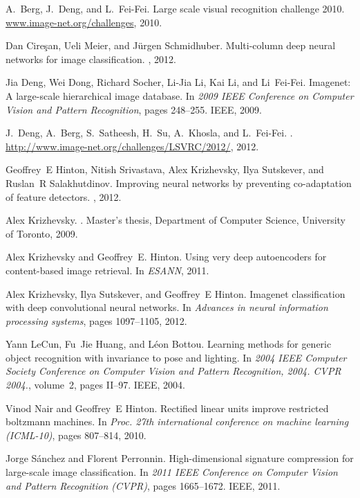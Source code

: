 \documentclass{article}
\begin{document}
\begin{thebibliography}{1}

A.~Berg, J.~Deng, and L.~Fei-Fei.
\newblock Large scale visual recognition challenge 2010.
\newblock \url{www.image-net.org/challenges}, 2010.

Dan Cire{\c{s}}an, Ueli Meier, and J{\"u}rgen Schmidhuber.
\newblock Multi-column deep neural networks for image classification.
, 2012.

Jia Deng, Wei Dong, Richard Socher, Li-Jia Li, Kai Li, and Li~Fei-Fei.
\newblock Imagenet: A large-scale hierarchical image database.
\newblock In {\em 2009 IEEE Conference on Computer Vision and Pattern
  Recognition}, pages 248--255. IEEE, 2009.

J.~Deng, A.~Berg, S.~Satheesh, H.~Su, A.~Khosla, and L.~Fei-Fei.
.
\newblock \url{http://www.image-net.org/challenges/LSVRC/2012/}, 2012.

Geoffrey~E Hinton, Nitish Srivastava, Alex Krizhevsky, Ilya Sutskever, and
  Ruslan~R Salakhutdinov.
\newblock Improving neural networks by preventing co-adaptation of feature
  detectors.
, 2012.

Alex Krizhevsky.
.
\newblock Master's thesis, Department of Computer Science, University of
  Toronto, 2009.

Alex Krizhevsky and Geoffrey~E. Hinton.
\newblock Using very deep autoencoders for content-based image retrieval.
\newblock In {\em ESANN}, 2011.

Alex Krizhevsky, Ilya Sutskever, and Geoffrey~E Hinton.
\newblock Imagenet classification with deep convolutional neural networks.
\newblock In {\em Advances in neural information processing systems}, pages
  1097--1105, 2012.

Yann LeCun, Fu~Jie Huang, and L{\'e}on Bottou.
\newblock Learning methods for generic object recognition with invariance to
  pose and lighting.
\newblock In {\em 2004 IEEE Computer Society Conference on Computer Vision and
  Pattern Recognition, 2004. CVPR 2004.}, volume~2, pages II--97. IEEE, 2004.

Vinod Nair and Geoffrey~E Hinton.
\newblock Rectified linear units improve restricted boltzmann machines.
\newblock In {\em Proc. 27th international conference on machine learning
  (ICML-10)}, pages 807--814, 2010.

Jorge S{\'a}nchez and Florent Perronnin.
\newblock High-dimensional signature compression for large-scale image
  classification.
\newblock In {\em 2011 IEEE Conference on Computer Vision and Pattern
  Recognition (CVPR)}, pages 1665--1672. IEEE, 2011.

\end{thebibliography}
\end{document}
